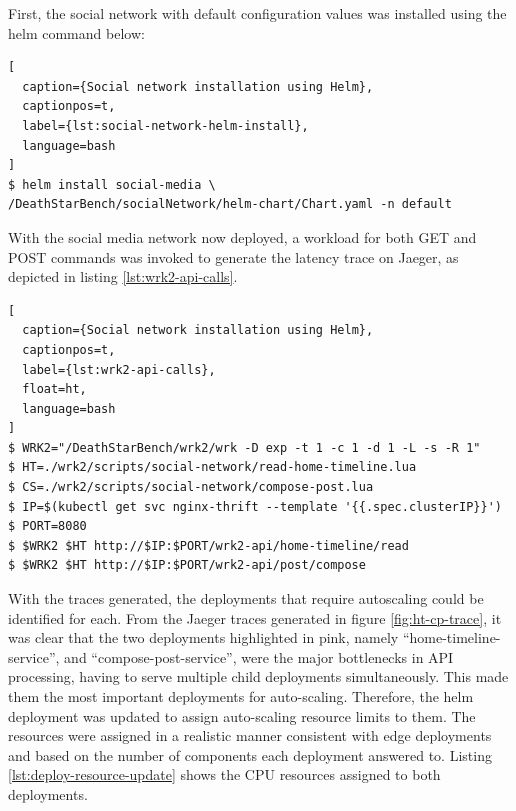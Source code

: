 First, the social network with default configuration values was installed using the helm command below:

\begin{lstlisting}[
  caption={Social network installation using Helm},
  captionpos=t,
  label={lst:social-network-helm-install},
  language=bash
]
$ helm install social-media \
/DeathStarBench/socialNetwork/helm-chart/Chart.yaml -n default
\end{lstlisting}

With the social media network now deployed, a workload for both GET and POST commands was invoked to generate the latency trace on Jaeger, as depicted in listing \ref{lst:wrk2-api-calls}.

\begin{lstlisting}[
  caption={Social network installation using Helm},
  captionpos=t,
  label={lst:wrk2-api-calls},
  float=ht,
  language=bash
]
$ WRK2="/DeathStarBench/wrk2/wrk -D exp -t 1 -c 1 -d 1 -L -s -R 1"
$ HT=./wrk2/scripts/social-network/read-home-timeline.lua
$ CS=./wrk2/scripts/social-network/compose-post.lua
$ IP=$(kubectl get svc nginx-thrift --template '{{.spec.clusterIP}}')
$ PORT=8080
$ $WRK2 $HT http://$IP:$PORT/wrk2-api/home-timeline/read
$ $WRK2 $HT http://$IP:$PORT/wrk2-api/post/compose
\end{lstlisting}

With the traces generated, the deployments that require autoscaling could be identified for each. From the Jaeger traces generated in figure \ref{fig:ht-cp-trace}, it was clear that the two deployments highlighted in pink, namely ``home-timeline-service'', and ``compose-post-service'', were the major bottlenecks in API processing, having to serve multiple child deployments simultaneously. This made them the most important deployments for auto-scaling. Therefore, the helm deployment was updated to assign auto-scaling resource limits to them. The resources were assigned in a realistic manner consistent with edge deployments and based on the number of components each deployment answered to. Listing \ref{lst:deploy-resource-update} shows the CPU resources assigned to both deployments.\par

